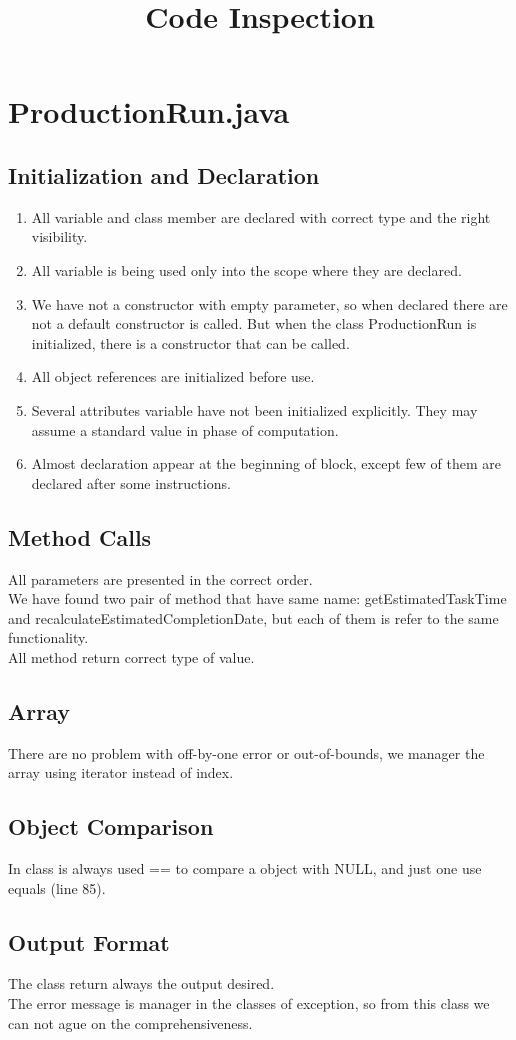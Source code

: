\documentclass{article}
\title{Code Inspection}
\begin{document}
\section{ProductionRun.java}

\subsection{Initialization and Declaration}
\begin{enumerate}
\item
All variable and class member are declared with correct type and the right visibility.
\item
All variable is being used only into the scope where they are declared.
\item
We have not a constructor with empty parameter, so when declared there are not a default constructor is called. But when the class ProductionRun is initialized, there is a constructor that can be called.
\item
All object references are initialized before use.
\item
Several attributes variable have not been initialized explicitly. They may assume a standard value in phase of computation. 
\item
Almost declaration appear at the beginning of block, except few of them are declared after some instructions.
\end{enumerate}
\subsection{Method Calls}
All parameters are presented in the correct order.\\
We have found two pair of method that have same name: getEstimatedTaskTime and recalculateEstimatedCompletionDate, but each of them is refer to the same functionality.\\
All method return correct type of value.
\subsection{Array}
There are no problem with off-by-one error or out-of-bounds, we manager the array using iterator instead of index.
\subsection{Object Comparison}
In class is always used == to compare a object with NULL, and just one use equals (line 85).
\subsection{Output Format}
The class return always the output desired.\\
The error message is manager in the classes of exception, so from this class we can not ague on the comprehensiveness.
\end{document}
